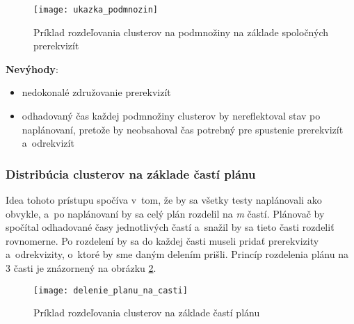 \begin{figure}[h]
  \begin{center}
    \texttt{[image: ukazka\_podmnozin]}
    \caption{Príklad rozdeľovania clusterov na podmnožiny na 
             základe spoločných prerekvizít}
    \label{obrazok:podmnoziny_testov}
  \end{center}
\end{figure}


\noindent \textbf{Nevýhody}:
\begin{itemize}
\item nedokonalé združovanie prerekvizít 
\item odhadovaný čas každej podmnožiny clusterov by nereflektoval stav 
po naplánovaní, pretože by neobsahoval čas potrebný pre spustenie 
prerekvizít a~odrekvizít
\end{itemize}

\subsubsection*{Distribúcia clusterov na základe častí plánu}
Idea tohoto prístupu spočíva v~tom, že by sa všetky testy naplánovali 
ako obvykle, a~po naplánovaní by sa celý plán rozdelil na \emph{m} častí. 
Plánovač by spočítal odhadované časy jednotlivých častí a~snažil by 
sa tieto časti rozdeliť rovnomerne. Po rozdelení by sa do každej časti 
museli pridať prerekvizity a~odrekvizity, o~ktoré by sme daným 
delením prišli. 
Princíp rozdelenia plánu na 3 časti je znázornený na obrázku 
\ref{obrazok:distribucia_na_casti}.

\begin{figure}[h]
  \begin{center}
    \texttt{[image: delenie\_planu\_na\_casti]}
    \caption{Príklad rozdeľovania clusterov na základe častí plánu}
    \label{obrazok:distribucia_na_casti}
  \end{center}
\end{figure}

